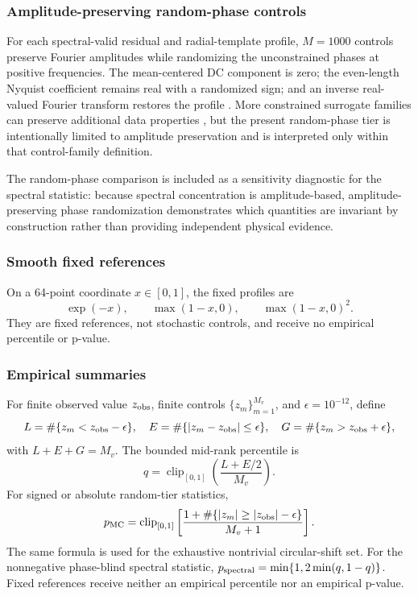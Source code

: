 \subsubsection{Amplitude-preserving random-phase controls}

For each spectral-valid residual and radial-template profile, $M=1000$
controls preserve Fourier amplitudes while randomizing the unconstrained
phases at positive frequencies. The mean-centered DC component is zero; the
even-length Nyquist coefficient remains real with a randomized sign; and an
inverse real-valued Fourier transform restores the profile
\citep{Theiler1992,SchreiberSchmitz2000}. More constrained surrogate families
can preserve additional data properties \citep{SchreiberSchmitz1996}, but the
present random-phase tier is intentionally limited to amplitude preservation
and is interpreted only within that control-family definition.

The random-phase comparison is included as a sensitivity diagnostic for the
spectral statistic: because spectral concentration is amplitude-based,
amplitude-preserving phase randomization demonstrates which quantities are
invariant by construction rather than providing independent physical
evidence.

\subsubsection{Smooth fixed references}

On a 64-point coordinate $x\in[0,1]$, the fixed profiles are
\begin{equation}
\exp(-x),\qquad \max(1-x,0),\qquad \max(1-x,0)^2.
\end{equation}
They are fixed references, not stochastic controls, and receive no empirical
percentile or p-value.

\subsubsection{Empirical summaries}

For finite observed value $z_{\rm obs}$, finite controls
$\{z_m\}_{m=1}^{M_v}$, and $\epsilon=10^{-12}$, define
\begin{equation}
L=\#\{z_m<z_{\rm obs}-\epsilon\},\quad
E=\#\{|z_m-z_{\rm obs}|\leq\epsilon\},\quad
G=\#\{z_m>z_{\rm obs}+\epsilon\},
\end{equation}
with $L+E+G=M_v$. The bounded mid-rank percentile is
\begin{equation}
q=\operatorname{clip}_{[0,1]}\left(\frac{L+E/2}{M_v}\right).
\end{equation}
For signed or absolute random-tier statistics,
\begin{equation}
p_{\rm MC}=\operatorname{clip}_{[0,1]}
\left[
\frac{1+\#\{|z_m|\geq |z_{\rm obs}|-\epsilon\}}{M_v+1}
\right].
\end{equation}
The same formula is used for the exhaustive nontrivial circular-shift set.
For the nonnegative phase-blind spectral statistic,
$p_{\rm spectral}=\min\{1,2\min(q,1-q)\}$. Fixed references receive neither
an empirical percentile nor an empirical p-value.

